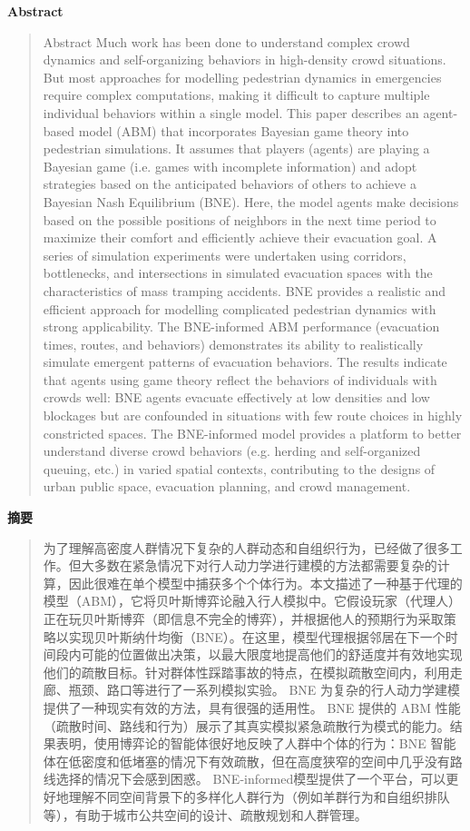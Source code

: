\vspace{1.5em}
\noindent\textbf{Abstract}\par
\begin{quote}\small
Abstract Much work has been done to understand complex crowd dynamics and self-organizing behaviors in high-density crowd situations. But most approaches for modelling pedestrian dynamics in emergencies require complex computations, making it difficult to capture multiple individual behaviors within a single model. This paper describes an agent-based model (ABM) that incorporates Bayesian game theory into pedestrian simulations. It assumes that players (agents) are playing a Bayesian game (i.e. games with incomplete information) and adopt strategies based on the anticipated behaviors of others to achieve a Bayesian Nash Equilibrium (BNE). Here, the model agents make decisions based on the possible positions of neighbors in the next time period to maximize their comfort and efficiently achieve their evacuation goal. A series of simulation experiments were undertaken using corridors, bottlenecks, and intersections in simulated evacuation spaces with the characteristics of mass tramping accidents. BNE provides a realistic and efficient approach for modelling complicated pedestrian dynamics with strong applicability. The BNE-informed ABM performance (evacuation times, routes, and behaviors) demonstrates its ability to realistically simulate emergent patterns of evacuation behaviors. The results indicate that agents using game theory reflect the behaviors of individuals with crowds well: BNE agents evacuate effectively at low densities and low blockages but are confounded in situations with few route choices in highly constricted spaces. The BNE-informed model provides a platform to better understand diverse crowd behaviors (e.g. herding and self-organized queuing, etc.) in varied spatial contexts, contributing to the designs of urban public space, evacuation planning, and crowd management.
\end{quote}

\noindent\textbf{摘要}\par
\begin{quote}\small
为了理解高密度人群情况下复杂的人群动态和自组织行为，已经做了很多工作。但大多数在紧急情况下对行人动力学进行建模的方法都需要复杂的计算，因此很难在单个模型中捕获多个个体行为。本文描述了一种基于代理的模型（ABM），它将贝叶斯博弈论融入行人模拟中。它假设玩家（代理人）正在玩贝叶斯博弈（即信息不完全的博弈），并根据他人的预期行为采取策略以实现贝叶斯纳什均衡（BNE）。在这里，模型代理根据邻居在下一个时间段内可能的位置做出决策，以最大限度地提高他们的舒适度并有效地实现他们的疏散目标。针对群体性踩踏事故的特点，在模拟疏散空间内，利用走廊、瓶颈、路口等进行了一系列模拟实验。 BNE 为复杂的行人动力学建模提供了一种现实有效的方法，具有很强的适用性。 BNE 提供的 ABM 性能（疏散时间、路线和行为）展示了其真实模拟紧急疏散行为模式的能力。结果表明，使用博弈论的智能体很好地反映了人群中个体的行为：BNE 智能体在低密度和低堵塞的情况下有效疏散，但在高度狭窄的空间中几乎没有路线选择的情况下会感到困惑。 BNE-informed模型提供了一个平台，可以更好地理解不同空间背景下的多样化人群行为（例如羊群行为和自组织排队等），有助于城市公共空间的设计、疏散规划和人群管理。
\end{quote}

